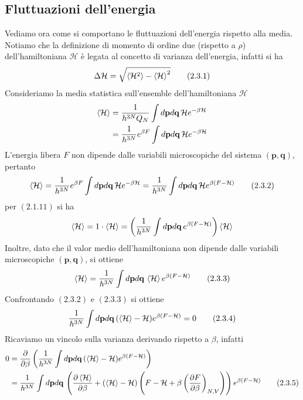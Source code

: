 \documentclass{article}
\begin{document}
\subsection{Fluttuazioni dell'energia}
Vediamo ora come si comportano le fluttuazioni dell'energia rispetto alla media. Notiamo che la definizione di momento di ordine due (rispetto a $\rho$) dell'hamiltoniana $\mathcal{H}$ è legata al concetto di varianza dell'energia, infatti si ha 
\begin{align}
    \Delta \mathcal{H} = \sqrt{\braket{\mathcal{H}^2} - \braket{\mathcal{H}}^2} \tag{2.3.1}
\end{align}
Consideriamo la media statistica sull'ensemble dell'hamiltoniana $\mathcal{H}$
\begin{align}
    \braket{\mathcal{H}} &= \frac{1}{h^{3N}Q_N}\int d\mathbf{p}d\mathbf{q} \, \mathcal{H}e^{-\beta\mathcal{H}} \notag \\
    &= \frac{1}{h^{3N}}e^{\beta F}\int d\mathbf{p}d\mathbf{q} \, \mathcal{H}e^{-\beta\mathcal{H}} \notag
\end{align}
L'energia libera $F$ non dipende dalle variabili microscopiche del sistema $(\mathbf{p}, \mathbf{q})$, pertanto 
\begin{align}
    \braket{\mathcal{H}} = \frac{1}{h^{3N}}e^{\beta F}\int d\mathbf{p}d\mathbf{q} \, \mathcal{H}e^{-\beta\mathcal{H}} = \frac{1}{h^{3N}}\int d\mathbf{p}d\mathbf{q} \, \mathcal{H}e^{\beta(F - \mathcal{H})} \tag{2.3.2}
\end{align}
per $(2.1.11)$ si ha 
\begin{align}
    \braket{\mathcal{H}} = 1 \cdot \braket{\mathcal{H}} = \left(\frac{1}{h^{3N}}\int d\mathbf{p}d\mathbf{q} \, e^{\beta(F - \mathcal{H})}\right)\braket{\mathcal{H}} \notag
\end{align}
Inoltre, dato che il valor medio dell'hamiltoniana non dipende dalle variabili microscopiche $(\mathbf{p}, \mathbf{q})$, si ottiene 
\begin{align}
    \braket{\mathcal{H}} = \frac{1}{h^{3N}}\int d\mathbf{p}d\mathbf{q} \, \braket{\mathcal{H}}e^{\beta(F - \mathcal{H})} \tag{2.3.3}
\end{align}
Confrontando $(2.3.2)$ e $(2.3.3)$ si ottiene 
\begin{align}
    \frac{1}{h^{3N}}\int d\mathbf{p}d\mathbf{q} \, (\braket{\mathcal{H}} - \mathcal{H})e^{\beta(F - \mathcal{H})} = 0 \tag{2.3.4}
\end{align}
Ricaviamo un vincolo sulla varianza derivando rispetto a $\beta$, infatti 
\begin{align}
    0 &= \frac{\partial}{\partial \beta}\left(\frac{1}{h^{3N}}\int d\mathbf{p}d\mathbf{q} \, (\braket{\mathcal{H}} - \mathcal{H})e^{\beta(F - \mathcal{H})}\right) \notag \\
    &= \frac{1}{h^{3N}}\int d\mathbf{p}d\mathbf{q} \, \left(\frac{\partial \braket{\mathcal{H}}}{\partial \beta} + (\braket{\mathcal{H}} - \mathcal{H})\left(F - \mathcal{H} + \beta\left(\frac{\partial F}{\partial \beta}\right)_{N, V}\right)\right)e^{\beta(F - \mathcal{H})} \tag{2.3.5}
\end{align}
\end{document}

